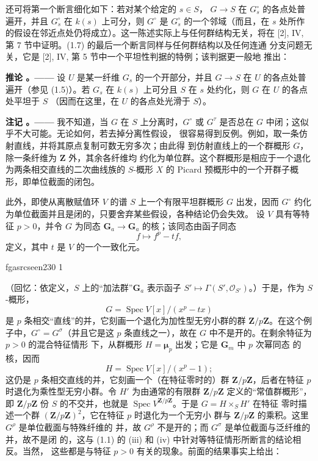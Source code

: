 \documentclass[12pt,twoside,openany]{book}
\numberwithin{equation}{section}
\newcommand{\fgaunitid}{unbound}
\newcommand{\src}[1]{%
  \phantomsection
  \hypertarget{src:\fgaunitid:#1}{}%
  \hypertarget{fga.\fgaunitid.p#1}{}%
  \ifcsname fgasrcseen#1\endcsname\else
    \expandafter\gdef\csname fgasrcseen#1\endcsname{1}%
    \hypertarget{src:#1}{}%
  \fi
  \marginpar{\raggedleft\footnotesize\sffamily #1}%
}
\theoremstyle{plain}
\theoremstyle{definition}
\theoremstyle{remark}
\newcommand{\result}[2]{%
  \par\medskip\noindent\textbf{#1%
  \if\relax\detokenize{#2}\relax\else\space#2\fi。——}\enspace
}
\begin{document}
还可将第一个断言细化如下：若对某个给定的 $s\in S$，
$G\longrightarrow S$ 在 $G_s^\circ$ 的各点处普遍开，并且 $G_s^\circ$ 在
$k(s)$ 上可分，则 $G^\circ$ 是 $G_s^\circ$ 的一个邻域（而且，在 $s$
处所作的假设在邻近点处仍将成立）。这一陈述实际上与任何群结构无关，将在
[2], IV, 第 7 节中证明。(1.7) 的最后一个断言同样与任何群结构以及任何连通
分支问题无关，它是 [2], IV, 第 5 节中一个平坦性判据的特例；该判据更一般地
推出：

\result{推论}{1.8} 设 $U$ 是某一纤维 $G_s$ 的一个开部分，并且
$G\longrightarrow S$ 在 $U$ 的各点处普遍开（参见 (1.5)）。若 $G_s$ 在
$k(s)$ 上可分且 $S$ 在 $s$ 处约化，则 $G$ 在 $U$ 的各点处平坦于 $S$
（因而在这里，在 $U$ 的各点处光滑于 $S$）。

\result{注记}{1.9} 我不知道，当 $G$ 在 $S$ 上分离时，$G^\circ$ 或
$G^\tau$ 是否总在 $G$ 中闭；这似乎不大可能。无论如何，若去掉分离性假设，
很容易得到反例。例如，取一条仿射直线，并将其原点复制可数无穷多次；由此得
到仿射直线上的一个群概形 $G$，除一条纤维为 $\mathbf Z$ 外，其余各纤维均
约化为单位群。这个群概形是相应于一个退化为两条相交直线的二次曲线族的
$S$-概形 $X$ 的 Picard 预概形中的一个开群子概形，即单位截面的闭包。

此外，即使从离散赋值环 $V$ 的谱 $S$ 上一个有限平坦群概形 $G$ 出发，因而
$G^\circ$ 约化为单位截面并且是闭的，只要舍弃某些假设，各种结论仍会失效。
设 $V$ 具有等特征 $p>0$，并令 $G$ 为同态
$\mathbf G_a\longrightarrow\mathbf G_a$ 的核；该同态由函子同态
\[
f\longmapsto f^p-tf,
\]
定义，其中 $t$ 是 $V$ 的一个一致化元。

\src{230}
（回忆：依定义，$S$ 上的“加法群”$\mathbf G_a$ 表示函子
$S'\longmapsto\Gamma(S',\mathcal O_{S'})$。）于是，作为 $S$-概形，
\[
G=\operatorname{Spec}V[x]/(x^p-tx)
\]
是 $p$ 条相交“直线”的并，它刻画一个退化为加性型无穷小群的群
$\mathbf Z/p\mathbf Z$。在这个例子中，$G^\circ=G^\sigma$（并且它是这
$p$ 条直线之一），故在 $G$ 中不是开的。在剩余特征为 $p>0$ 的混合特征情形
下，从群概形 $H=\boldsymbol\mu_p$ 出发；它是 $\mathbf G_m$ 中 $p$ 次幂同态
的核，因而
\[
H=\operatorname{Spec}V[x]/(x^p-1) ;
\]
这仍是 $p$ 条相交直线的并，它刻画一个（在特征零时的）群
$\mathbf Z/p\mathbf Z$，后者在特征 $p$ 时退化为乘性型无穷小群。令 $H'$
为由通常的有限群 $\mathbf Z/p\mathbf Z$ 定义的“常值群概形”，即
$\mathbf Z/p\mathbf Z$ 份 $S$ 的不交并，也就是
$\operatorname{Spec}V^{\mathbf Z/p\mathbf Z}$。于是 $G=H\times_S H'$ 在特征
零时描述一个群 $(\mathbf Z/p\mathbf Z)^2$，它在特征 $p$ 时退化为一个无穷小
群与 $\mathbf Z/p\mathbf Z$ 的乘积。这里 $G^\rho$ 是单位截面与特殊纤维的
并，故 $G^\rho$ 不是开的；而 $G^\sigma$ 是单位截面与泛纤维的并，故不是闭
的，这与 (1.1) 的 (iii) 和 (iv) 中针对等特征情形所断言的结论相反。当然，
这些都是与特征 $p>0$ 有关的现象。前面的结果事实上给出：
\end{document}
